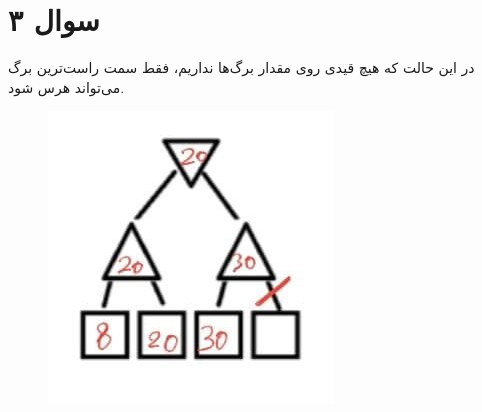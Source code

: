 \documentclass[a4paper, 12pt]{article}
\begin{document}
\section*{سوال ۳}
در این حالت که هیچ قیدی روی مقدار برگ‌ها نداریم، فقط سمت راست‌ترین برگ می‌تواند هرس شود.
\begin{figure}[H]
	\centering
	\includegraphics[width=.3\textwidth]{3-1.jpg}
\end{figure}
\end{document}
